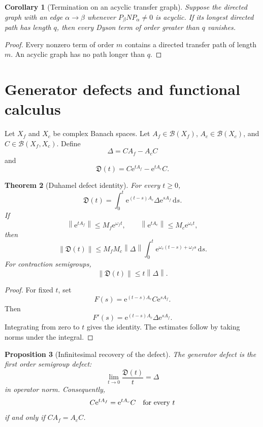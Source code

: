 \documentclass[11pt,a4paper]{article}
\newtheorem{theorem}{Theorem}[section]
\newtheorem{proposition}[theorem]{Proposition}
\newtheorem{corollary}[theorem]{Corollary}
\theoremstyle{definition}
\theoremstyle{remark}
\newcommand{\norm}[1]{\left\lVert#1\right\rVert}
\newcommand{\e}{\mathrm e}
\newcommand{\dd}{\,\mathrm d}
\begin{document}
\begin{corollary}[Termination on an acyclic transfer graph]\label{extended:record:009}\label{extended:cor:acyclic_termination}
Suppose the directed graph with an edge \(\alpha\to\beta\) whenever \(P_\beta NP_\alpha\neq0\) is acyclic. If its longest directed path has length \(q\), then every Dyson term of order greater than \(q\) vanishes.
\end{corollary}

\begin{proof}
Every nonzero term of order \(m\) contains a directed transfer path of length \(m\). An acyclic graph has no path longer than \(q\).
\end{proof}

\section{Generator defects and functional calculus}\label{extended:section:03}\label{extended:sec:defects}

Let \(X_f\) and \(X_c\) be complex Banach spaces. Let \(A_f\in\mathcal B(X_f)\), \(A_c\in\mathcal B(X_c)\), and \(C\in\mathcal B(X_f,X_c)\). Define
\[
\Delta=CA_f-A_cC
\]
and
\[
\mathfrak D(t)=C\e^{tA_f}-\e^{tA_c}C.
\]

\begin{theorem}[Duhamel defect identity]\label{extended:record:010}\label{extended:thm:duhamel_defect}
For every \(t\geq0\),
\[
\mathfrak D(t)
=
\int_0^t
\e^{(t-s)A_c}\Delta\e^{sA_f}
\dd s.
\]
If
\[
\norm{\e^{tA_f}}\leq M_f\e^{\omega_f t},
\qquad
\norm{\e^{tA_c}}\leq M_c\e^{\omega_c t},
\]
then
\[
\norm{\mathfrak D(t)}
\leq
M_fM_c\norm\Delta
\int_0^t
\e^{\omega_c(t-s)+\omega_fs}
\dd s.
\]
For contraction semigroups,
\[
\norm{\mathfrak D(t)}\leq t\norm\Delta.
\]
\end{theorem}

\begin{proof}
For fixed \(t\), set
\[
F(s)=\e^{(t-s)A_c}C\e^{sA_f}.
\]
Then
\[
F'(s)=\e^{(t-s)A_c}\Delta\e^{sA_f}.
\]
Integrating from zero to \(t\) gives the identity. The estimates follow by taking norms under the integral.
\end{proof}

\begin{proposition}[Infinitesimal recovery of the defect]\label{extended:record:011}\label{extended:prop:infinitesimal_defect}
The generator defect is the first order semigroup defect:
\[
\lim_{t\to0}
\frac{\mathfrak D(t)}{t}
=
\Delta
\]
in operator norm. Consequently,
\[
C\e^{tA_f}=\e^{tA_c}C
\quad\hbox{for every }t
\]
if and only if \(CA_f=A_cC\).
\end{proposition}
\end{document}

